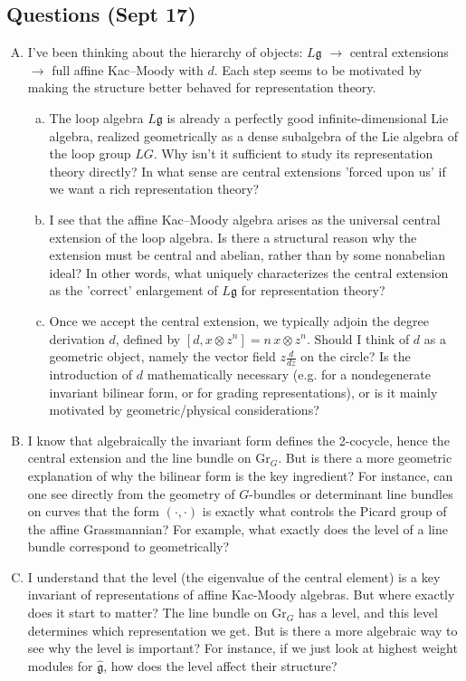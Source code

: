 \documentclass[12pt]{article}
\begin{document}
\subsection*{Questions (Sept 17)}
\begin{enumerate}[A.]
    \item I've been thinking about the hierarchy of objects: $L\mathfrak g$ $\to$ central extensions $\to$ full affine Kac–Moody with $d$. Each step seems to be motivated by making the structure better behaved for representation theory.
        \begin{enumerate}[a)] 
            \item The loop algebra $L\mathfrak g$ is already a perfectly good infinite-dimensional Lie algebra, realized geometrically as a dense subalgebra of the Lie algebra of the loop group $LG$. Why isn't it sufficient to study its representation theory directly? In what sense are central extensions 'forced upon us' if we want a rich representation theory?
            \item I see that the affine Kac–Moody algebra arises as the universal central extension of the loop algebra. Is there a structural reason why the extension must be central and abelian, rather than by some nonabelian ideal? In other words, what uniquely characterizes the central extension as the 'correct' enlargement of $L\mathfrak g$ for representation theory?
            \item Once we accept the central extension, we typically adjoin the degree derivation $d$, defined by $[d, x\otimes z^n]=n\,x\otimes z^n$. Should I think of $d$ as a geometric object, namely the vector field $z\frac{d}{dz}$ on the circle? Is the introduction of $d$ mathematically necessary (e.g. for a nondegenerate invariant bilinear form, or for grading representations), or is it mainly motivated by geometric/physical considerations?
        \end{enumerate}
    \item I know that algebraically the invariant form defines the 2-cocycle, hence the central extension and the line bundle on $\mathrm{Gr}_G$. But is there a more geometric explanation of why the bilinear form is the key ingredient? For instance, can one see directly from the geometry of $G$-bundles or determinant line bundles on curves that the form $(\cdot,\cdot)$ is exactly what controls the Picard group of the affine Grassmannian? For example, what exactly does the level of a line bundle correspond to geometrically?
    \item I understand that the level (the eigenvalue of the central element) is a key invariant of representations of affine Kac-Moody algebras. But where exactly does it start to matter? The line bundle on $\mathrm{Gr}_G$ has a level, and this level determines which representation we get. But is there a more algebraic way to see why the level is important? For instance, if we just look at highest weight modules for $\widehat{\mathfrak g}$, how does the level affect their structure?
\end{enumerate}
\end{document}
